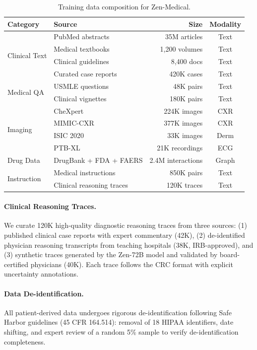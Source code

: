 \documentclass[11pt,a4paper]{article}
\begin{document}
\begin{table}[t]
\centering
\caption{Training data composition for Zen-Medical.}
\label{tab:data}
\begin{tabular}{llrc}
\toprule
\textbf{Category} & \textbf{Source} & \textbf{Size} & \textbf{Modality} \\
\midrule
\multirow{4}{*}{Clinical Text} & PubMed abstracts & 35M articles & Text \\
& Medical textbooks & 1,200 volumes & Text \\
& Clinical guidelines & 8,400 docs & Text \\
& Curated case reports & 420K cases & Text \\
\midrule
\multirow{2}{*}{Medical QA} & USMLE questions & 48K pairs & Text \\
& Clinical vignettes & 180K pairs & Text \\
\midrule
\multirow{4}{*}{Imaging} & CheXpert & 224K images & CXR \\
& MIMIC-CXR & 377K images & CXR \\
& ISIC 2020 & 33K images & Derm \\
& PTB-XL & 21K recordings & ECG \\
\midrule
Drug Data & DrugBank + FDA + FAERS & 2.4M interactions & Graph \\
\midrule
\multirow{2}{*}{Instruction} & Medical instructions & 850K pairs & Text \\
& Clinical reasoning traces & 120K traces & Text \\
\bottomrule
\end{tabular}
\end{table}

\paragraph{Clinical Reasoning Traces.} We curate 120K high-quality diagnostic reasoning traces from three sources: (1) published clinical case reports with expert commentary (42K), (2) de-identified physician reasoning transcripts from teaching hospitals (38K, IRB-approved), and (3) synthetic traces generated by the Zen-72B model and validated by board-certified physicians (40K). Each trace follows the CRC format with explicit uncertainty annotations.

\paragraph{Data De-identification.} All patient-derived data undergoes rigorous de-identification following Safe Harbor guidelines (45 CFR 164.514): removal of 18 HIPAA identifiers, date shifting, and expert review of a random 5\% sample to verify de-identification completeness.
\end{document}

